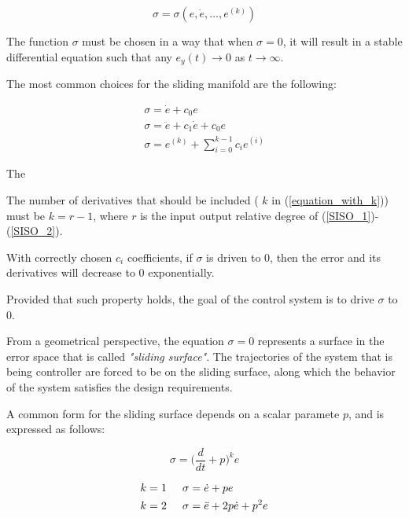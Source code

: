 \documentclass{thesisreport}
\begin{document}
\begin{equation}
	\sigma = \sigma(e,\dot{e},\ldots,e^{(k)})
\end{equation}


The function $\sigma$ must be chosen in a way that when $\sigma=0$, it will result in a stable differential equation such that any $e_y(t) \rightarrow 0$ as $t \rightarrow \infty$.


The most common choices for the sliding manifold are the following:

\begin{align}
\sigma = \dot{e} + c_0 e\\
\sigma = \ddot{e} + c_1 \dot{e} + c_0 e \\
\sigma = e^{(k)} + \sum_{i=0}^{k-1} c_i e^{(i)}\label{equation_with_k}
\end{align} 


The 
 

The number of derivatives that should be included ( $k$ in (\ref{equation_with_k})) must be $k=r-1$, where $r$ is the input output relative
degree of  (\ref{SISO_1})-(\ref{SISO_2}).


With correctly chosen $c_i$ coefficients, if $\sigma$ is driven to 0, then the error and its derivatives will decrease to 0 exponentially.



Provided that such property holds, the goal of the  control system is to drive $\sigma$ to 0.


From a geometrical perspective, the equation $\sigma=0$ represents a surface in the error space that is called \textit{"sliding surface"}. The trajectories of the system that is being controller are forced to be on the sliding surface, along which the behavior of the system satisfies the design requirements.


A common form for the sliding surface depends on a  scalar paramete $p$, and is expressed as follows:

\begin{equation}
\sigma = \bigg(\frac{d}{dt}+p\bigg)^k e
\end{equation}

\begin{align}
k&=1 \text{\hspace{0.5cm}} \sigma = \dot{e} + pe \\
k&=2 \text{\hspace{0.5cm}} \sigma = \ddot{e} + 2p \dot{e} + p^2 e
\end{align}
 
\end{document}
